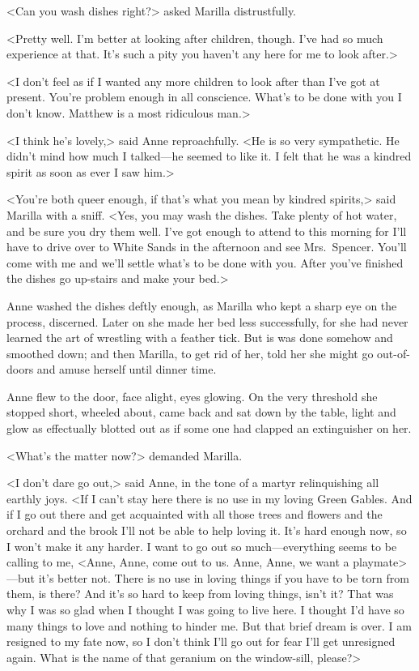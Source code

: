 <Can you wash dishes right?> asked Marilla distrustfully.

<Pretty well. I'm better at looking after children, though. I've had so much experience at that. It's such a pity you haven't any here for me to look after.>

<I don't feel as if I wanted any more children to look after than I've got at present. You're problem enough in all conscience. What's to be done with you I don't know. Matthew is a most ridiculous man.>

<I think he's lovely,> said Anne reproachfully. <He is so very sympathetic. He didn't mind how much I talked—he seemed to like it. I felt that he was a kindred spirit as soon as ever I saw him.>

<You're both queer enough, if that's what you mean by kindred spirits,> said Marilla with a sniff. <Yes, you may wash the dishes. Take plenty of hot water, and be sure you dry them well. I've got enough to attend to this morning for I'll have to drive over to White Sands in the afternoon and see Mrs.~Spencer. You'll come with me and we'll settle what's to be done with you. After you've finished the dishes go up-stairs and make your bed.>

Anne washed the dishes deftly enough, as Marilla who kept a sharp eye on the process, discerned. Later on she made her bed less successfully, for she had never learned the art of wrestling with a feather tick. But is was done somehow and smoothed down; and then Marilla, to get rid of her, told her she might go out-of-doors and amuse herself until dinner time.

Anne flew to the door, face alight, eyes glowing. On the very threshold she stopped short, wheeled about, came back and sat down by the table, light and glow as effectually blotted out as if some one had clapped an extinguisher on her.

<What's the matter now?> demanded Marilla.

<I don't dare go out,> said Anne, in the tone of a martyr relinquishing all earthly joys. <If I can't stay here there is no use in my loving Green Gables. And if I go out there and get acquainted with all those trees and flowers and the orchard and the brook I'll not be able to help loving it. It's hard enough now, so I won't make it any harder. I want to go out so much—everything seems to be calling to me, <Anne, Anne, come out to us. Anne, Anne, we want a playmate>—but it's better not. There is no use in loving things if you have to be torn from them, is there? And it's so hard to keep from loving things, isn't it? That was why I was so glad when I thought I was going to live here. I thought I'd have so many things to love and nothing to hinder me. But that brief dream is over. I am resigned to my fate now, so I don't think I'll go out for fear I'll get unresigned again. What is the name of that geranium on the window-sill, please?>

